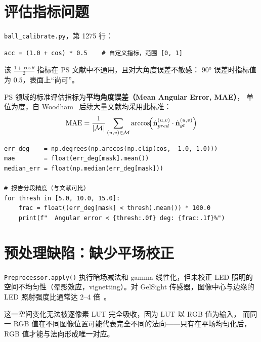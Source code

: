 \documentclass[12pt, a4paper]{ctexart}
\begin{document}
\section{评估指标问题}
\label{sec:eval}

\texttt{ball\_calibrate.py}，第 1275 行：

\begin{lstlisting}
acc = (1.0 + cos) * 0.5    # 自定义指标，范围 [0, 1]
\end{lstlisting}

该 $\frac{1+\cos\theta}{2}$ 指标在 PS 文献中不通用，且对大角度误差不敏感：
$90°$ 误差时指标值为 $0.5$，表面上``尚可''。

PS 领域的标准评估指标为\textbf{平均角度误差（Mean Angular Error, MAE）}，
单位为度，自 Woodham~\cite{woodham1980photometric} 后续大量文献均采用此标准：
\[
  \text{MAE} = \frac{1}{|\mathcal{M}|}
  \sum_{(u,v) \in \mathcal{M}}
  \arccos\!\Bigl(\hat{\mathbf{n}}_{pred}^{(u,v)} \cdot \hat{\mathbf{n}}_{gt}^{(u,v)}\Bigr)
\]

\begin{fixbox}
\begin{lstlisting}
err_deg    = np.degrees(np.arccos(np.clip(cos, -1.0, 1.0)))
mae        = float(err_deg[mask].mean())
median_err = float(np.median(err_deg[mask]))

# 报告分段精度（与文献可比）
for thresh in [5.0, 10.0, 15.0]:
    frac = float((err_deg[mask] < thresh).mean()) * 100.0
    print(f"  Angular error < {thresh:.0f} deg: {frac:.1f}%")
\end{lstlisting}
\end{fixbox}

\section{预处理缺陷：缺少平场校正}
\label{sec:preproc}

\texttt{Preprocessor.apply()} 执行暗场减法和 gamma 线性化，但未校正 LED 照明的
空间不均匀性（晕影效应，vignetting）。对 GelSight 传感器，图像中心与边缘的 LED
照射强度比通常达 2--4 倍~\cite{yuan2017gelsight,dong2017improved}。

这一空间变化无法被逐像素 LUT 完全吸收，因为 LUT 以 RGB 值为输入，
而同一 RGB 值在不同图像位置可能代表完全不同的法向——只有在平场均匀化后，
RGB 值才能与法向形成唯一对应。
\end{document}
